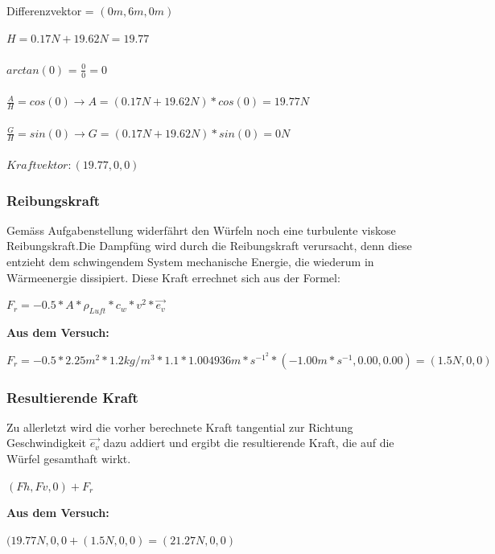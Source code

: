 \documentclass[../main.tex]{subfiles}
\begin{document}
Differenzvektor = $(0m,6m,0m)$\\
\begin{mdframed}
$H = 0.17N +19.62N = 19.77$\\\\
$arctan(0)$ = $\frac{0}{0} = 0$\\\\
$\frac{A}{H}= cos(0) \rightarrow A = (0.17N +19.62N) * cos(0)= 19.77N$\\\\
$\frac{G}{H}= sin(0) \rightarrow G = (0.17N +19.62N) * sin(0)= 0N$\\\\
$Kraftvektor: (19.77,0,0)$
\end{mdframed}
\subsubsection{Reibungskraft}
Gemäss Aufgabenstellung widerfährt den Würfeln noch eine turbulente viskose Reibungskraft.Die Dampfüng wird durch die Reibungskraft verursacht, denn diese entzieht dem schwingendem System mechanische Energie, die wiederum in Wärmeenergie dissipiert. Diese Kraft errechnet sich aus der Formel:
\begin{mdframed}
$F_r = -0.5 * A*\rho_{Luft}*c_w*v^2*\vec{e_v}$
\end{mdframed}
\textbf {Aus dem Versuch:}
\begin{mdframed}
$F_r = -0.5 * 2.25m^2*1.2kg/m^3*1.1*1.004936m*s^{-1}^2*(-1.00m*s^{-1}, 0.00, 0.00) = (1.5N,0,0)$
\end{mdframed}
\subsubsection{Resultierende Kraft}
Zu allerletzt wird die vorher berechnete Kraft tangential zur Richtung Geschwindigkeit $\vec{e_v}$ dazu addiert und ergibt die resultierende Kraft, die auf die Würfel gesamthaft wirkt.
\begin{mdframed}
$(Fh,Fv,0) + F_r$
\end{mdframed}
\textbf {Aus dem Versuch:}
\begin{mdframed}
$(19.77N,0,0 + (1.5N,0,0) = (21.27N,0,0)$
\end{mdframed}
\end{document}

